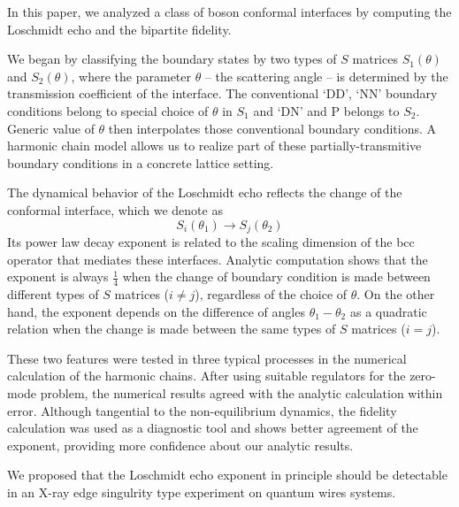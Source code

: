 
In this paper, we analyzed a class of boson conformal interfaces by computing the Loschmidt echo and the bipartite fidelity. 

We began by classifying the boundary states by two types of $S$ matrices $S_1(\theta)$ and $S_2(\theta)$, where the parameter $\theta$ -- the scattering angle -- is determined by the transmission coefficient of the interface. The conventional `DD', `NN' boundary conditions belong to special choice of $\theta$ in $S_1$ and  `DN' and P belongs to $S_2$. Generic value of $\theta$ then interpolates those conventional boundary conditions. A harmonic chain model allows us to realize part of these partially-transmitive boundary conditions in a concrete lattice setting. 

The dynamical behavior of the Loschmidt echo reflects the change of the conformal interface, which we denote as
\begin{equation}
S_i( \theta_1 ) \rightarrow S_j( \theta_2 ) 
\end{equation}
Its power law decay exponent is related to the scaling dimension of the bcc operator that mediates these interfaces. Analytic computation shows that the exponent is always $\frac{1}{4}$ when the change of boundary condition is made between different types of $S$ matrices ($i \ne j$), regardless of the choice of $\theta$. On the other hand, the exponent depends on the difference of angles $\theta_1 - \theta_2$ as a quadratic relation when the change is made between the same types of $S$ matrices ($i = j$).

These two features were tested in three typical processes in the numerical calculation of the harmonic chains. After using suitable regulators for the zero-mode problem, the numerical results agreed with the analytic calculation within error. Although tangential to the non-equilibrium dynamics, the fidelity calculation was used as a diagnostic tool and shows better agreement of the exponent, providing more confidence about our analytic results. 

We proposed that the Loschmidt echo exponent in principle should be detectable in an X-ray edge singulrity type experiment on quantum wires systems. 

